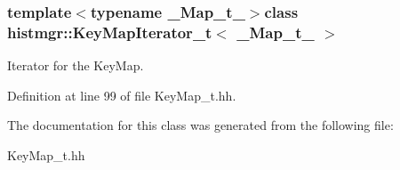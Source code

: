 \subsubsection*{template$<$typename \-\_\-\-Map\-\_\-t\-\_\-$>$class histmgr\-::\-Key\-Map\-Iterator\-\_\-t$<$ \-\_\-\-Map\-\_\-t\-\_\- $>$}

Iterator for the Key\-Map. 

Definition at line 99 of file Key\-Map\-\_\-t.\-hh.



The documentation for this class was generated from the following file\-:\begin{DoxyCompactItemize}
\item 
Key\-Map\-\_\-t.\-hh\end{DoxyCompactItemize}
